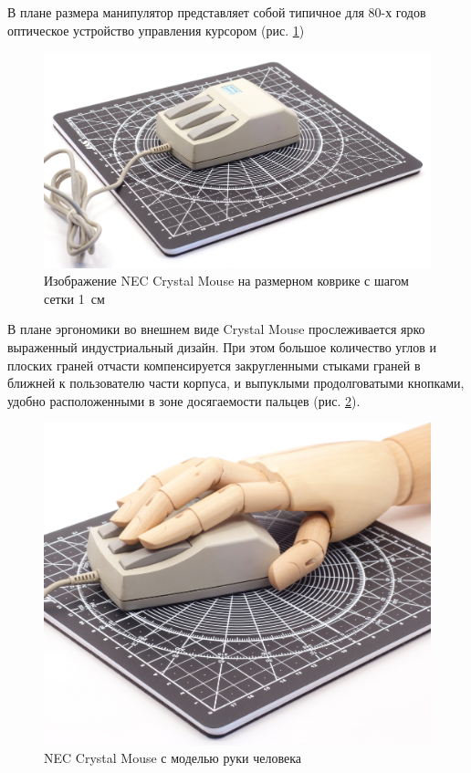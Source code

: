 \documentclass[11pt, a4paper]{article}
\begin{document}
В плане размера манипулятор представляет собой типичное для 80-х годов оптическое устройство управления курсором (рис. \ref{fig:NecCrystalSize})

\begin{figure}[h]
    \centering
    \includegraphics[scale=0.4]{1986_nec_crystal_mouse/NecKovrik_60.jpg}
    \caption{Изображение NEC Crystal Mouse на размерном коврике с шагом сетки 1~см}
    \label{fig:NecCrystalSize}
\end{figure}

В плане эргономики во внешнем виде Crystal Mouse прослеживается ярко выраженный индустриальный дизайн. При этом большое количество углов и плоских граней отчасти компенсируется закругленными стыками граней в ближней к пользователю части корпуса, и выпуклыми продолговатыми кнопками, удобно расположенными в зоне досягаемости пальцев (рис. \ref{fig:NecCrystalHand}).

\begin{figure}[h]
    \centering
    \includegraphics[scale=0.4]{1986_nec_crystal_mouse/NecRuka_30.jpg}
    \caption{NEC Crystal Mouse с моделью руки человека}
    \label{fig:NecCrystalHand}
\end{figure}
\end{document}
